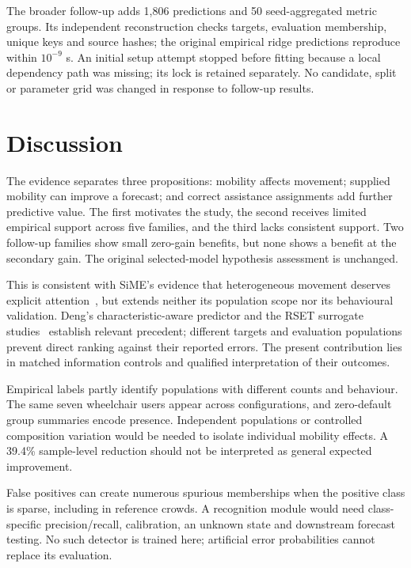 \documentclass[conference]{IEEEtran}
\begin{document}
The broader follow-up adds 1,806 predictions and 50 seed-aggregated metric groups. Its independent reconstruction checks targets, evaluation membership, unique keys and source hashes; the original empirical ridge predictions reproduce within $10^{-9}$ s. An initial setup attempt stopped before fitting because a local dependency path was missing; its lock is retained separately. No candidate, split or parameter grid was changed in response to follow-up results.

\section{Discussion}
The evidence separates three propositions: mobility affects movement; supplied mobility can improve a forecast; and correct assistance assignments add further predictive value. The first motivates the study, the second receives limited empirical support across five families, and the third lacks consistent support. Two follow-up families show small zero-gain benefits, but none shows a benefit at the secondary gain. The original selected-model hypothesis assessment is unchanged.

This is consistent with SiME's evidence that heterogeneous movement deserves explicit attention~\cite{sime,geoerg}, but extends neither its population scope nor its behavioural validation. Deng's characteristic-aware predictor and the RSET surrogate studies~\cite{deng,rset,femtc} establish relevant precedent; different targets and evaluation populations prevent direct ranking against their reported errors. The present contribution lies in matched information controls and qualified interpretation of their outcomes.

Empirical labels partly identify populations with different counts and behaviour. The same seven wheelchair users appear across configurations, and zero-default group summaries encode presence. Independent populations or controlled composition variation would be needed to isolate individual mobility effects. A 39.4\% sample-level reduction should not be interpreted as general expected improvement.

False positives can create numerous spurious memberships when the positive class is sparse, including in reference crowds. A recognition module would need class-specific precision/recall, calibration, an unknown state and downstream forecast testing. No such detector is trained here; artificial error probabilities cannot replace its evaluation.
\end{document}
